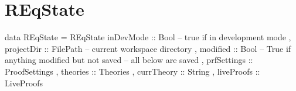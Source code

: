 \newpage
\section{REqState}

\begin{code}
data REqState
 = REqState {
      inDevMode   ::  Bool -- true if in development mode
    , projectDir  ::  FilePath -- current workspace directory
    , modified    ::  Bool -- True if anything modified but not saved
    -- all below are saved
    , prfSettings ::  ProofSettings
    , theories    ::  Theories
    , currTheory  ::  String
    , liveProofs  ::  LiveProofs
    }
\end{code}


